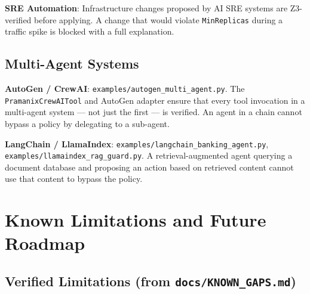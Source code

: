 \documentclass[12pt,a4paper,oneside]{report}
\newcommand{\fname}[1]{\texttt{#1}}          %
\newcommand{\code}[1]{\texttt{#1}}           %
\begin{document}
\textbf{SRE Automation}: Infrastructure changes proposed by AI SRE systems
are Z3-verified before applying. A change that would violate
\code{MinReplicas} during a traffic spike is blocked with a full explanation.

\section{Multi-Agent Systems}

\textbf{AutoGen / CrewAI}: \fname{examples/autogen\_multi\_agent.py}. The
\code{PramanixCrewAITool} and AutoGen adapter ensure that every tool
invocation in a multi-agent system --- not just the first --- is verified. An
agent in a chain cannot bypass a policy by delegating to a sub-agent.

\textbf{LangChain / LlamaIndex}:
\fname{examples/langchain\_banking\_agent.py},
\fname{examples/llamaindex\_rag\_guard.py}. A retrieval-augmented agent
querying a document database and proposing an action based on retrieved
content cannot use that content to bypass the policy.

\chapter{Known Limitations and Future Roadmap}

\section{Verified Limitations (from \fname{docs/KNOWN\_GAPS.md})}
\end{document}
